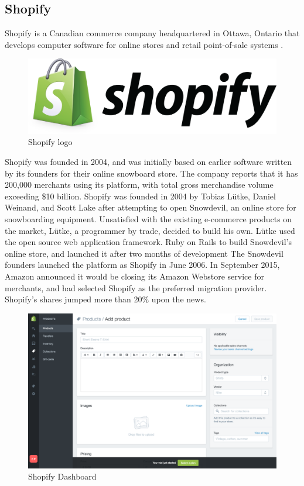 \subsection{Shopify}
Shopify is a Canadian commerce company headquartered in Ottawa, Ontario that develops computer software for online stores and retail point-of-sale systems \cite{shopify_overview}.
\begin{figure}[htb]
  \centering
  \includegraphics[width=0.4\linewidth]{images/chapter1/shopify_logo.png}\hfill
  \caption[Shopify logo]{Shopify logo}
  \label{fig:ebay_logo}
\end{figure}
Shopify was founded in 2004, and was initially based on earlier software written by its founders for their online snowboard store. The company reports that it has 200,000 merchants using its platform, with total gross merchandise volume exceeding \$10 billion.
Shopify was founded in 2004 by Tobias Lütke, Daniel Weinand, and Scott Lake after attempting to open Snowdevil, an online store for snowboarding equipment. Unsatisfied with the existing e-commerce products on the market, Lütke, a programmer by trade, decided to build his own.
Lütke used the open source web application framework. Ruby on Rails to build Snowdevil's online store, and launched it after two months of development The Snowdevil founders launched the platform as Shopify in June 2006.
In September 2015, Amazon announced it would be closing its Amazon Webstore service for merchants, and had selected Shopify as the preferred migration provider. Shopify's shares jumped more than 20\% upon the news.
\begin{figure}[htb]
 \centering
 \includegraphics[width=1.0\linewidth]{images/chapter1/ex-shopify.png}\hfill
 \caption[Shopify Dashboard]{Shopify Dashboard}
 \label{fig:shopify_dashboard}
\end{figure}
